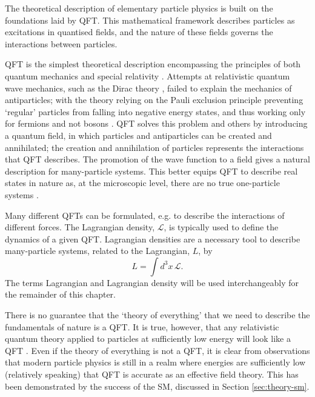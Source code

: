 
The theoretical description of elementary particle physics is built on the
foundations laid by \ac{QFT}. This mathematical framework describes particles as
excitations in quantised fields, and the nature of these fields governs the
interactions between particles.

\ac{QFT} is the simplest theoretical description encompassing the principles of
both quantum mechanics and special relativity
\cite{Weinberg1995}. Attempts at relativistic quantum wave mechanics, such as
the Dirac theory \cite{Dirac1930}, failed to explain the mechanics of
antiparticles; with the theory relying on the Pauli exclusion principle
\cite{Pauli1925} preventing `regular' particles from falling into negative
energy states, and thus working only for fermions and not bosons
\cite[p.14]{Weinberg1995}.  \ac{QFT} solves this problem and others by
introducing a quantum field, in which particles and antiparticles can be created
and annihilated; the creation and annihilation of particles represents the
interactions that \ac{QFT} describes.
The promotion of the wave function to a field gives a natural description for
many-particle systems. This better equips QFT to describe real states in nature
as, at the microscopic level, there are no true one-particle systems
\cite{Weisskopf1981}.

\newcommand\Lden{\ensuremath{\mathcal{L}}\xspace}
Many different \acp{QFT} can be formulated, e.g. to describe the interactions
of different forces. The Lagrangian density, \Lden, is typically used to define
the dynamics of a given \ac{QFT}. Lagrangian densities are a necessary tool to
describe many-particle systems, related to the Lagrangian, $L$, by
%
\begin{equation*}
  L = \int d^3x \, \Lden .
\end{equation*}
The terms Lagrangian and Lagrangian density will be used interchangeably for the
remainder of this chapter.

There is no guarantee that the `theory of everything' that we need to describe
the fundamentals of nature is a \ac{QFT}. It is true, however, that any
relativistic quantum theory applied to particles at sufficiently low energy will
look like a \ac{QFT} \cite{Weinberg1995}. Even if the theory of everything is
not a \ac{QFT}, it is clear from observations that modern particle physics is
still in a realm where energies are sufficiently low (relatively speaking) that
\ac{QFT} is accurate as an effective field theory. This has been demonstrated by
the success of the \ac{SM}, discussed in Section \ref{sec:theory-sm}.
